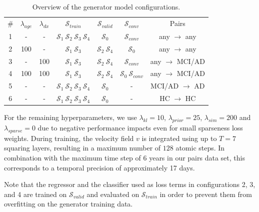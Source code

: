 \begin{table}[h]
	\begin{center}
		\begin{tabular}{c c c c c c c}
			\toprule
			\# & $\lambda_{age}$ & $\lambda_{dx}$ &
				$\mathcal{S}_{train}$ & $\mathcal{S}_{valid}$ & $\mathcal{S}_{conv}$ & Pairs \\
			\cmidrule(lr){1-7}
			1 &  -  &  -  & $\mathcal{S}_1\:\mathcal{S}_2\:\mathcal{S}_3\:\mathcal{S}_4$ &
				      $\mathcal{S}_0$ &
				      $\mathcal{S}_{conv}$ &
				      \footnotesize any $\rightarrow$ any \\
			2 & 100 &  -  & $\mathcal{S}_1\:\mathcal{S}_3$ & 
				      $\mathcal{S}_2\:\mathcal{S}_4$ &
				      $\mathcal{S}_0$ & 
				      \footnotesize any $\rightarrow$ any \\
			3 &  -  & 100 & $\mathcal{S}_1\:\mathcal{S}_3$ & 
				      $\mathcal{S}_2\:\mathcal{S}_4$ &
				      $\mathcal{S}_{conv}$ & 
				      \footnotesize any $\rightarrow$ MCI/AD \\
			4 & 100 & 100 & $\mathcal{S}_1\:\mathcal{S}_3$ & 
				      $\mathcal{S}_2\:\mathcal{S}_4$ &
				      $\mathcal{S}_0\:\mathcal{S}_{conv}$ &
				      \footnotesize any $\rightarrow$ MCI/AD \\
			5 &  -  &  -  & $\mathcal{S}_1\:\mathcal{S}_2\:\mathcal{S}_3\:\mathcal{S}_4$ &
				      $\mathcal{S}_0$ &
				      - &
				      \footnotesize MCI/AD $\rightarrow$ AD \\
			6 &  -  &  -  & $\mathcal{S}_1\:\mathcal{S}_2\:\mathcal{S}_3\:\mathcal{S}_4$ &
				      $\mathcal{S}_0$ &
				      - &
				      \footnotesize HC $\rightarrow$ HC \\
			\bottomrule
		\end{tabular}
		\caption{Overview of the generator model configurations.}
		\label{tab:ganconfig}
	\end{center}
\end{table}

For the remaining hyperparameters, we use $\lambda_{kl} = 10$, $\lambda_{prior} = 25$, $\lambda_{sim} = 200$ and $\lambda_{sparse} = 0$ due to negative performance impacts even for small sparseness loss weights. During training, the velocity field $v$ is integrated using up to $T = 7$ squaring layers, resulting in a maximum number of $128$ atomic steps. In combination with the maximum time step of 6 years in our pairs data set, this corresponds to a temporal precision of approximately 17 days.

Note that the regressor and the classifier used as loss terms in configurations 2, 3, and 4 are trained on $\mathcal{S}_{valid}$ and evaluated on $\mathcal{S}_{train}$ in order to prevent them from overfitting on the generator training data.

